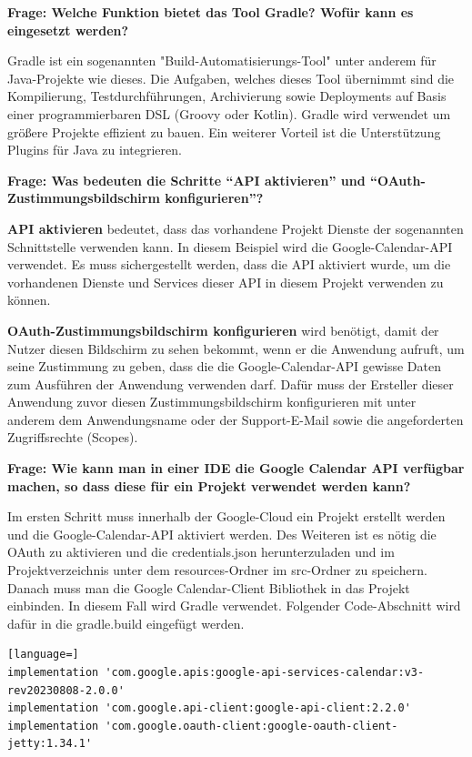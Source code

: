 \documentclass[a4paper]{article}
\newenvironment{frage}[1]{%
	\par\noindent\textbf{Frage: #1}\par
}{\medskip}
\begin{document}
	\begin{frage}{Welche Funktion bietet das Tool Gradle? Wofür kann es eingesetzt werden?}
	 Gradle ist ein sogenannten "Build-Automatisierungs-Tool" unter anderem für Java-Projekte wie dieses. Die Aufgaben, welches dieses Tool übernimmt sind die Kompilierung, Testdurchführungen, Archivierung sowie Deployments auf Basis einer programmierbaren DSL (Groovy oder Kotlin). Gradle wird verwendet um größere Projekte effizient zu bauen. Ein weiterer Vorteil ist die Unterstützung Plugins für Java zu integrieren.
	\end{frage}
	\\
	\begin{frage}{Was bedeuten die Schritte ``API aktivieren'' und ``OAuth-Zustimmungsbildschirm konfigurieren''?}
		
		\textbf{API aktivieren} bedeutet, dass das vorhandene Projekt Dienste der sogenannten Schnittstelle verwenden kann. In diesem Beispiel wird die Google-Calendar-API verwendet. Es muss sichergestellt werden, dass die API aktiviert wurde, um die vorhandenen Dienste und Services dieser API in diesem Projekt verwenden zu können.
		
		\textbf{OAuth-Zustimmungsbildschirm konfigurieren} wird benötigt, damit der Nutzer diesen Bildschirm zu sehen bekommt, wenn er die Anwendung aufruft, um seine Zustimmung zu geben, dass die die Google-Calendar-API gewisse Daten zum Ausführen der Anwendung verwenden darf. Dafür muss der Ersteller dieser Anwendung zuvor diesen Zustimmungsbildschirm konfigurieren mit unter anderem dem Anwendungsname oder der Support-E-Mail sowie die angeforderten Zugriffsrechte (Scopes). 
	\end{frage}
	
	\begin{frage}{Wie kann man in einer IDE die Google Calendar API verfügbar machen, so dass diese für ein Projekt verwendet werden kann?}
		
		Im ersten Schritt muss innerhalb der Google-Cloud ein Projekt erstellt werden und die Google-Calendar-API aktiviert werden. Des Weiteren ist es nötig die OAuth zu aktivieren und die credentials.json herunterzuladen und im Projektverzeichnis unter dem resources-Ordner im src-Ordner zu speichern. Danach muss man die Google Calendar-Client Bibliothek in das Projekt einbinden. In diesem Fall wird Gradle verwendet. Folgender Code-Abschnitt wird dafür in die gradle.build eingefügt werden.
		\begin{lstlisting}[language=]
implementation 'com.google.apis:google-api-services-calendar:v3-rev20230808-2.0.0'
implementation 'com.google.api-client:google-api-client:2.2.0'
implementation 'com.google.oauth-client:google-oauth-client-jetty:1.34.1'	
		\end{lstlisting}
	\end{frage}
\end{document}
